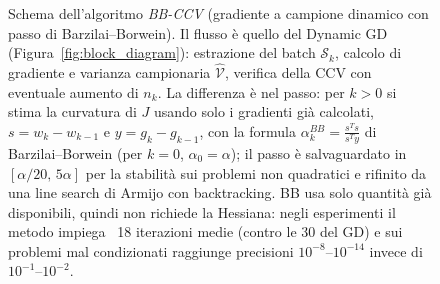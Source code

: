 \documentclass[italian, a4paper, twoside, binding=6mm]{sapthesis}
\begin{document}
\begin{figure}[H]
{}
\caption{Schema dell'algoritmo \emph{BB-CCV} (gradiente a campione dinamico con
passo di Barzilai--Borwein). Il flusso è quello del Dynamic GD
(Figura~\ref{fig:block_diagram}): estrazione del batch $\mathcal{S}_k$, calcolo
di gradiente e varianza campionaria $\widehat{\mathcal{V}}$, verifica della CCV
con eventuale aumento di $n_k$. La differenza è nel passo: per $k > 0$ si stima
la curvatura di $J$ usando solo i gradienti già calcolati, $s = w_k - w_{k-1}$
e $y = g_k - g_{k-1}$, con la formula $\alpha_k^{BB} = \frac{s^T s}{s^T y}$ di
Barzilai--Borwein (per $k = 0$, $\alpha_0 = \alpha$); il passo è salvaguardato in
$[\alpha/20,\, 5\alpha]$ per la stabilità sui problemi non quadratici e rifinito
da una line search di Armijo con backtracking. BB usa solo quantità già
disponibili, quindi non richiede la Hessiana: negli esperimenti il metodo impiega
~18 iterazioni medie (contro le 30 del GD) e sui problemi mal condizionati
raggiunge precisioni $10^{-8}$--$10^{-14}$ invece di $10^{-1}$--$10^{-2}$.}
\label{fig:bbccv}
\end{figure}
\end{document}
